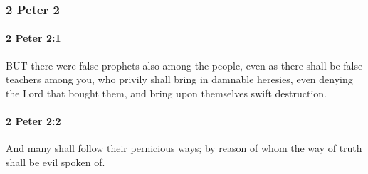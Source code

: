 	\subsubsection{2 Peter 2} %
		\label{2PETER-2}
		
		\paragraph{2 Peter 2:1} %
			\label{2PETER-2-1}

			BUT there were false prophets also among the people, even as there shall be false teachers among you, who privily shall bring in damnable heresies, even denying the Lord that bought them, and bring upon themselves swift destruction.

			\begin{framed}
			\scriptsize
				\begin{compactdesc}
					\item[SBLG] 
				\end{compactdesc}
			\end{framed}

		\paragraph{2 Peter 2:2} %
			\label{2PETER-2-2}

			And many shall follow their pernicious ways; by reason of whom the way of truth shall be evil spoken of.

